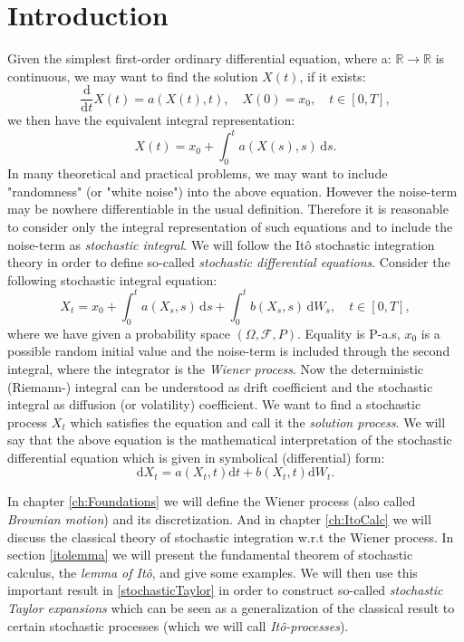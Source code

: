 \chapter{Introduction}

Given the simplest first-order ordinary differential equation, where a: \(\mathbb{R}\to\mathbb{R}\) is continuous, we may want to find the solution \(X(t)\), if it exists:
\[\frac{\mathrm{d}}{\mathrm{d}t}X(t) = a(X(t),t),\quad X(0) = x_0,\quad t\in [0,T],\]
we then have the equivalent integral representation:
\[X(t) = x_0 + \int_0^t \!a(X(s),s)\,\mathrm{d}s.\]
In many theoretical and practical problems, we may want to include "randomness" (or "white noise") into the above equation.
However the noise-term may be nowhere differentiable in the usual definition. Therefore it is reasonable to consider only the integral representation of such equations and to include the noise-term as \emph{stochastic integral}.
We will follow the It\^o stochastic integration theory in order to define so-called \emph{stochastic differential equations}. Consider the following stochastic integral equation:
\[X_t = x_0 + \int_0^t \!a(X_s,s)\,\mathrm{d}s + \int_0^t \!b(X_s,s)\,\mathrm{d}W_{s},\quad t\in [0,T],\]
where we have given a probability space \(\left( \Omega , \mathcal{F}, P\right)\). Equality is P-a.s, \(x_0\) is a possible random initial value and the noise-term is included through the second integral, where the integrator is the \emph{Wiener process}. Now the deterministic (Riemann-) integral can be understood as drift coefficient and the stochastic integral as diffusion (or volatility) coefficient. We want to find a stochastic process \(X_t\) which satisfies the equation and call it the \emph{solution process}.
We will say that the above equation is the mathematical interpretation of the stochastic differential equation which is given in symbolical (differential) form:
\[\mathrm{d}X_t = a(X_t,t)\mathrm{d}t + b(X_t,t)\mathrm{d}W_t.\]

In chapter \ref{ch:Foundations} we will define the Wiener process (also called \emph{Brownian motion}) and its discretization.
And in chapter \ref{ch:ItoCalc} we will discuss the classical theory of stochastic integration w.r.t the Wiener process.
In section \ref{itolemma} we will present the fundamental theorem of stochastic calculus, the \emph{lemma of It\^o}, and give some examples. We will then use this important result in \ref{stochasticTaylor} in order to construct so-called 
\emph{stochastic Taylor expansions} which can be seen as a generalization of the classical result to certain stochastic processes (which we will call \emph{It\^o-processes}).
\linebreak

